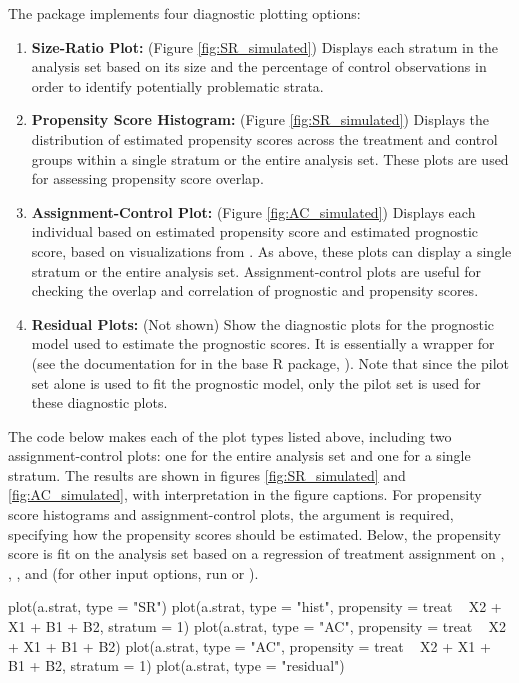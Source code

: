 The  package implements four diagnostic plotting options:
\begin{enumerate}
    \item \textbf{Size-Ratio Plot:} (Figure \ref{fig:SR_simulated}) Displays each stratum in the analysis set based on its size and the percentage of control observations in order to identify potentially problematic strata.
    \item \textbf{Propensity Score Histogram:} (Figure \ref{fig:SR_simulated}) Displays the distribution of estimated propensity scores across the treatment and control groups within a single stratum or the entire analysis set. These plots are used for assessing propensity score overlap.
    \item \textbf{Assignment-Control Plot:} (Figure \ref{fig:AC_simulated}) Displays each individual based on estimated propensity score and estimated prognostic score, based on visualizations from \citet{aikens2020pilot}.  As above, these plots can display a single stratum or the entire analysis set. Assignment-control plots are useful for checking the overlap and correlation of prognostic and propensity scores.
    \item \textbf{Residual Plots:} (Not shown) Show the diagnostic plots for the prognostic model used to estimate the prognostic scores. It is essentially a wrapper for  (see the documentation for  in the base R package, ). Note that since the pilot set alone is used to fit the prognostic model, only the pilot set is used for these diagnostic plots.
\end{enumerate}

The code below makes each of the plot types listed above, including two assignment-control plots: one for the entire analysis set and one for a single stratum.  The results are shown in figures \ref{fig:SR_simulated} and \ref{fig:AC_simulated}, with interpretation in the figure captions. For propensity score histograms and assignment-control plots, the  argument is required, specifying how the propensity scores should be estimated. Below, the propensity score is fit on the analysis set based on a regression of treatment assignment on , , , and  (for other input options, run  or ).

\begin{example}
plot(a.strat, type = "SR")
plot(a.strat, type = "hist", propensity = treat ~ X2 + X1 + B1 + B2, stratum = 1)
plot(a.strat, type = "AC", propensity = treat ~ X2 + X1 + B1 + B2)
plot(a.strat, type = "AC", propensity = treat ~ X2 + X1 + B1 + B2, stratum = 1)
plot(a.strat, type = "residual")
\end{example}

